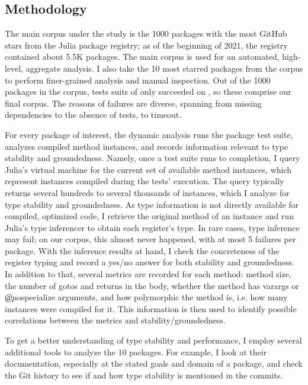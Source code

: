 \subsection{Methodology}

The main corpus under the study is the 1000 packages with the most GitHub stars
from the Julia package registry; as of the beginning of 2021, the registry
contained about 5.5K packages. The main corpus is used for an automated,
high-level, aggregate analysis. I also take the 10 most starred packages from
the corpus to perform finer-grained analysis and manual inspection. Out of the
1000 packages in the corpus, tests suits of only \goodpkgsnum succeeded on
\juliaversion, so these \goodpkgsnum comprise our final corpus. The reasons of
failures are diverse, spanning from missing dependencies to the absence of
tests, to timeout.

For every package of interest, the dynamic analysis runs the package test suite,
analyzes compiled method instances, and records information relevant to
type stability and groundedness. Namely, once a test suite runs to completion,
I query Julia's virtual machine for the current set of available method
instances, which represent instances compiled during the tests' execution.
The query typically returns
several hundreds to several thousands of instances,
which I
analyze for type stability and groundedness. As type information is not
directly available for compiled, optimized code, I retrieve the original method
of an instance and run Julia's type inferencer to obtain each register's type.
In rare cases, type inference may fail;
on our corpus, this almost never happened, with at most 5 failures per package.
With the inference results at hand, I check the concreteness of the register
typing and record a yes/no answer for both stability and groundedness. In
addition to that, several metrics are recorded for each method:
method size, the number of gotos and returns in the body, whether the method has
varargs or \c{@nospecialize} arguments, and
how polymorphic the method is, i.e. how many instances were compiled for it.
This information is then used to identify possible correlations between the
metrics and stability/groundedness.

To get a better understanding of type stability and performance, I employ
several additional tools to analyze the 10 packages. For example, I look at
their documentation, especially at the stated goals and domain of a package, and
check the Git history to see if and how type stability is mentioned in the
commits.

